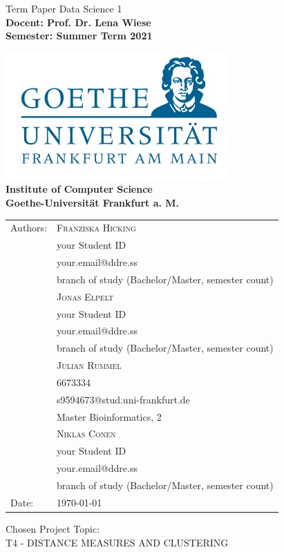 \documentclass[12pt]%
{article}
\begin{document}
\begin{titlepage}

\begin{center}

{\Huge {
Term Paper Data Science 1}
}
\\[2ex]

\textbf{
\Large 
Docent: Prof. Dr. Lena Wiese \\ 
Semester: Summer Term 2021\\  
}



\includegraphics[scale=0.4]{logo.jpg} \\ 
\large{\textbf{Institute of Computer Science \\ Goethe-Universit\"at Frankfurt a. M.}}



\begin{tabular}{ll}
Authors: & \textsc{Franziska Hicking} \\
& {\small your Student ID} \\
& {\small your.email@ddre.ss} \\
& {\small branch of study (Bachelor/Master, semester count)} \\
& \textsc{Jonas Elpelt} \\
& {\small your Student ID}\\
&{\small  your.email@ddre.ss}\\
& {\small branch of study (Bachelor/Master, semester count)} \\
& \textsc{Julian Rummel} \\
&{\small  6673334}\\
& {\small s9594673@stud.uni-frankfurt.de}\\
&{\small  Master Bioinformatics, 2} \\
& \textsc{Niklas Conen}\\
& {\small your Student ID}\\
& {\small your.email@ddre.ss}\\
& {\small branch of study (Bachelor/Master, semester count)}\\
Date: & \today \\		
\end{tabular}

\end{center}

\vspace*{\fill}

\large
\noindent{}Chosen Project Topic: \\
T4 - DISTANCE MEASURES AND CLUSTERING


\end{titlepage}
\end{document}

